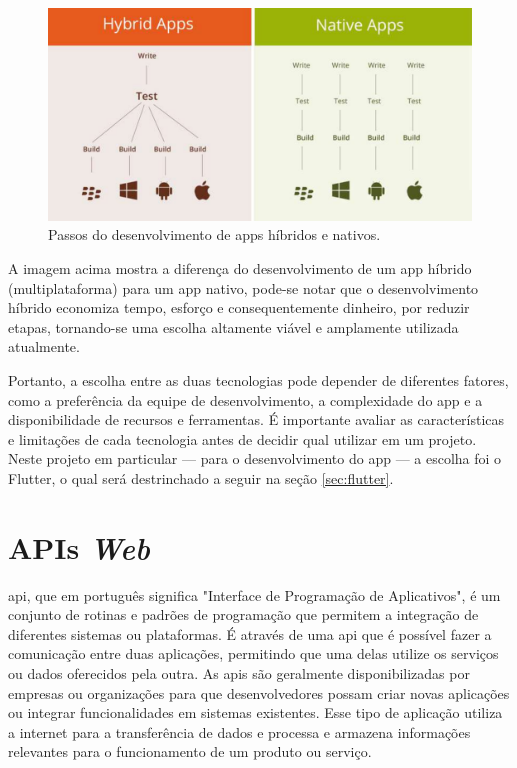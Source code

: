 \begin{figure}[H]
\centering
  \includegraphics[width=\columnwidth]{images/native-diff.pdf}
  \caption{Passos do desenvolvimento de \acp{app} híbridos e nativos.}
  \label{fig:native_diff}
\end{figure}

A imagem acima mostra a diferença do desenvolvimento de um \ac{app} híbrido (multiplataforma) para um \ac{app} nativo, pode-se notar que o desenvolvimento híbrido economiza tempo, esforço e consequentemente dinheiro, por reduzir etapas, tornando-se uma escolha altamente viável e amplamente utilizada atualmente.

Portanto, a escolha entre as duas tecnologias pode depender de diferentes fatores, como a preferência da equipe de desenvolvimento, a complexidade do \ac{app} e a disponibilidade de recursos e ferramentas. É importante avaliar as características e limitações de cada tecnologia antes de decidir qual utilizar em um projeto. Neste projeto em particular — para o desenvolvimento do \ac{app} — a escolha foi o Flutter, o qual será destrinchado a seguir na seção \ref{sec:flutter}.

\section{APIs \textit{Web}}\label{sec:apis_web}
\ac{api}, que em português significa "Interface de Programação de Aplicativos", é um conjunto de rotinas e padrões de programação que permitem a integração de diferentes sistemas ou plataformas. É através de uma \ac{api} que é possível fazer a comunicação entre duas aplicações, permitindo que uma delas utilize os serviços ou dados oferecidos pela outra. As \acp{api} são geralmente disponibilizadas por empresas ou organizações para que desenvolvedores possam criar novas aplicações ou integrar funcionalidades em sistemas existentes. Esse tipo de aplicação utiliza a internet para a transferência
de dados e processa e armazena informações relevantes para o funcionamento de um produto
ou serviço.

